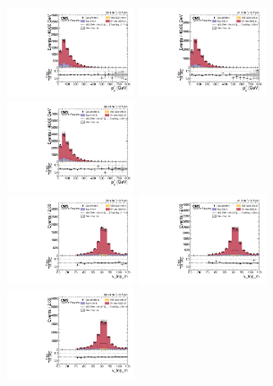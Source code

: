 \begin{figure}[!ht]
  \centering
  \includegraphics[width=0.335\textwidth]{analysis_plots/2016_zjj/cr_vjets_l/v_lep_pt.pdf} \hspace{-10pt}
  \includegraphics[width=0.335\textwidth]{analysis_plots/2017_zjj/cr_vjets_l/v_lep_pt.pdf} \hspace{-10pt}
  \includegraphics[width=0.335\textwidth]{analysis_plots/2018_zjj/cr_vjets_l/v_lep_pt.pdf} \hspace{-10pt} \\
  \includegraphics[width=0.335\textwidth]{analysis_plots/2016_zjj/cr_vjets_l/v_lep_m.pdf} \hspace{-10pt}
  \includegraphics[width=0.335\textwidth]{analysis_plots/2017_zjj/cr_vjets_l/v_lep_m.pdf} \hspace{-10pt}
  \includegraphics[width=0.335\textwidth]{analysis_plots/2018_zjj/cr_vjets_l/v_lep_m.pdf} \hspace{-10pt} \\

\end{figure}
